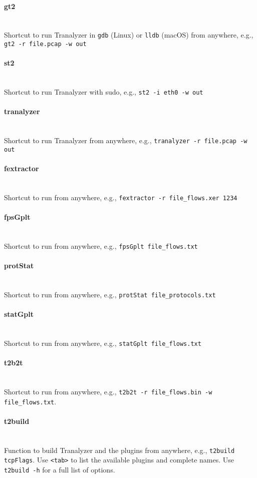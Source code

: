 \documentclass[documentation]{subfiles}
\begin{document}
\paragraph{gt2}~\\
Shortcut to run Tranalyzer in {\tt gdb} (Linux) or {\tt lldb} (macOS) from anywhere, e.g., {\tt gt2 -r file.pcap -w out}
\paragraph{st2}~\\
Shortcut to run Tranalyzer with sudo, e.g., {\tt st2 -i eth0 -w out}
\paragraph{tranalyzer}~\\
Shortcut to run Tranalyzer from anywhere, e.g., {\tt tranalyzer -r file.pcap -w out}
\paragraph{fextractor}~\\
Shortcut to run {\tt{}} from anywhere, e.g., {\tt fextractor -r file\_flows.xer 1234}
\paragraph{fpsGplt}~\\
Shortcut to run {\tt{}} from anywhere, e.g., {\tt fpsGplt file\_flows.txt}
\paragraph{protStat}~\\
Shortcut to run {\tt{}} from anywhere, e.g., {\tt protStat file\_protocols.txt}
\paragraph{statGplt}~\\
Shortcut to run {\tt{}} from anywhere, e.g., {\tt statGplt file\_flows.txt}
\paragraph{t2b2t}~\\
Shortcut to run  from anywhere, e.g., {\tt t2b2t -r file\_flows.bin -w file\_flows.txt}.
\paragraph{t2build}~\\
Function to build Tranalyzer and the plugins from anywhere, e.g., {\tt t2build tcpFlags}.
Use {\tt <tab>} to list the available plugins and complete names.
Use {\tt t2build -h} for a full list of options.
\end{document}
